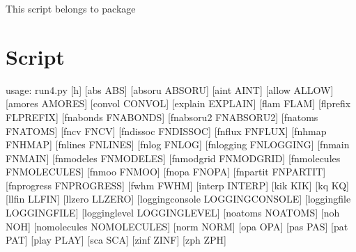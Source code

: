 \documentclass[letterpaper,10pt,english]{sphinxmanual}
\begin{document}
This script belongs to package 


\section{Script }
\label{\detokenize{autoscripts/script-run4::doc}}\label{\detokenize{autoscripts/script-run4:script-run4-py}}
\begin{sphinxVerbatim}[commandchars=\\\{\}]
usage: run4.py [\PYGZhy{}h] [\PYGZhy{}\PYGZhy{}abs ABS] [\PYGZhy{}\PYGZhy{}absoru ABSORU] [\PYGZhy{}\PYGZhy{}aint AINT]
               [\PYGZhy{}\PYGZhy{}allow ALLOW] [\PYGZhy{}\PYGZhy{}amores AMORES] [\PYGZhy{}\PYGZhy{}convol CONVOL]
               [\PYGZhy{}\PYGZhy{}explain EXPLAIN] [\PYGZhy{}\PYGZhy{}flam FLAM] [\PYGZhy{}\PYGZhy{}flprefix FLPREFIX]
               [\PYGZhy{}\PYGZhy{}fn\PYGZus{}abonds FN\PYGZus{}ABONDS] [\PYGZhy{}\PYGZhy{}fn\PYGZus{}absoru2 FN\PYGZus{}ABSORU2]
               [\PYGZhy{}\PYGZhy{}fn\PYGZus{}atoms FN\PYGZus{}ATOMS] [\PYGZhy{}\PYGZhy{}fn\PYGZus{}cv FN\PYGZus{}CV] [\PYGZhy{}\PYGZhy{}fn\PYGZus{}dissoc FN\PYGZus{}DISSOC]
               [\PYGZhy{}\PYGZhy{}fn\PYGZus{}flux FN\PYGZus{}FLUX] [\PYGZhy{}\PYGZhy{}fn\PYGZus{}hmap FN\PYGZus{}HMAP] [\PYGZhy{}\PYGZhy{}fn\PYGZus{}lines FN\PYGZus{}LINES]
               [\PYGZhy{}\PYGZhy{}fn\PYGZus{}log FN\PYGZus{}LOG] [\PYGZhy{}\PYGZhy{}fn\PYGZus{}logging FN\PYGZus{}LOGGING] [\PYGZhy{}\PYGZhy{}fn\PYGZus{}main FN\PYGZus{}MAIN]
               [\PYGZhy{}\PYGZhy{}fn\PYGZus{}modeles FN\PYGZus{}MODELES] [\PYGZhy{}\PYGZhy{}fn\PYGZus{}modgrid FN\PYGZus{}MODGRID]
               [\PYGZhy{}\PYGZhy{}fn\PYGZus{}molecules FN\PYGZus{}MOLECULES] [\PYGZhy{}\PYGZhy{}fn\PYGZus{}moo FN\PYGZus{}MOO]
               [\PYGZhy{}\PYGZhy{}fn\PYGZus{}opa FN\PYGZus{}OPA] [\PYGZhy{}\PYGZhy{}fn\PYGZus{}partit FN\PYGZus{}PARTIT]
               [\PYGZhy{}\PYGZhy{}fn\PYGZus{}progress FN\PYGZus{}PROGRESS] [\PYGZhy{}\PYGZhy{}fwhm FWHM] [\PYGZhy{}\PYGZhy{}interp INTERP]
               [\PYGZhy{}\PYGZhy{}kik KIK] [\PYGZhy{}\PYGZhy{}kq KQ] [\PYGZhy{}\PYGZhy{}llfin LLFIN] [\PYGZhy{}\PYGZhy{}llzero LLZERO]
               [\PYGZhy{}\PYGZhy{}logging\PYGZus{}console LOGGING\PYGZus{}CONSOLE]
               [\PYGZhy{}\PYGZhy{}logging\PYGZus{}file LOGGING\PYGZus{}FILE] [\PYGZhy{}\PYGZhy{}logging\PYGZus{}level LOGGING\PYGZus{}LEVEL]
               [\PYGZhy{}\PYGZhy{}no\PYGZus{}atoms NO\PYGZus{}ATOMS] [\PYGZhy{}\PYGZhy{}no\PYGZus{}h NO\PYGZus{}H]
               [\PYGZhy{}\PYGZhy{}no\PYGZus{}molecules NO\PYGZus{}MOLECULES] [\PYGZhy{}\PYGZhy{}norm NORM] [\PYGZhy{}\PYGZhy{}opa OPA]
               [\PYGZhy{}\PYGZhy{}pas PAS] [\PYGZhy{}\PYGZhy{}pat PAT] [\PYGZhy{}\PYGZhy{}play PLAY] [\PYGZhy{}\PYGZhy{}sca SCA] [\PYGZhy{}\PYGZhy{}zinf ZINF]
               [\PYGZhy{}\PYGZhy{}zph ZPH]


\end{sphinxVerbatim}
\end{document}
